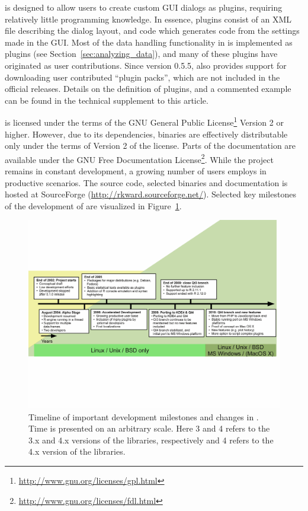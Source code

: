  is designed to allow users to create custom GUI dialogs as plugins, requiring relatively
little programming knowledge. In essence,  plugins consist of an XML file describing
the dialog layout, and  code which generates  code from the settings
made in the GUI. Most of the data handling functionality in  is implemented as plugins
(see Section~\ref{sec:analyzing_data}), and many of these plugins have originated as user contributions.
Since version 0.5.5,  also provides support for downloading user contributed ``plugin packs'',
which are not included in the official  releases. Details on the definition of plugins,
and a commented example can be found in the technical supplement to this article.

 is licensed under the terms of the GNU General Public License\footnote{\url{http://www.gnu.org/licenses/gpl.html}} Version 2
or higher. However, due to its dependencies,  binaries are effectively
distributable only under the terms of Version 2 of the license. Parts of the documentation are available under the
GNU Free Documentation License\footnote{\url{http://www.gnu.org/licenses/fdl.html}}. While the project remains in constant development, a growing
number of users employs  in productive scenarios. The source code,
selected binaries and documentation is hosted at SourceForge
(\url{http://rkward.sourceforge.net/}). Selected key milestones of the development of  are
visualized in Figure~\ref{fig:timeline}.

\begin{figure}[b!]
 \centering
 \includegraphics[clip=true,trim=0cm 5.7cm 0cm 5.7cm,width=15.4cm]{./figures/timeline.pdf}
 \caption{Timeline of important development milestones and changes in .
          Time is presented on an arbitrary scale. Here 3 and 4 refers to the 3.x and
          4.x versions of the  libraries, respectively and 4 refers to the
          4.x version of the  libraries.}
 \label{fig:timeline}
\end{figure}

